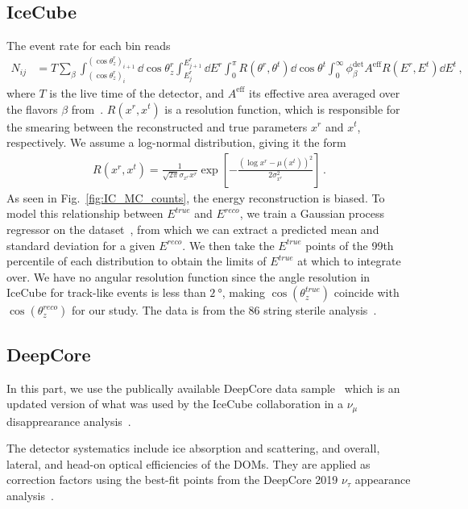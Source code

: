 \documentclass[draft=True]{revtex4-2}
\newcommand{\zreco}{\ensuremath{\cos{(\theta_z^{reco})}}}
\newcommand{\ztrue}{\ensuremath{\cos{(\theta_z^{true})}}}
\newcommand{\Ereco}{E^{reco}}
\newcommand{\Etrue}{E^{true}}
\begin{document}
\subsection{IceCube}\label{ch:ICmethod}
The event rate for each bin reads
\begin{align}\label{eq:ICevents}
   N_{ij} &= T\sum_\beta \int_{(\cos{\theta_z^r})_i}^{(\cos{\theta_z^r})_{i+1}} \dd \cos{\theta^r_z} \int_{E^r_{j}}^{E^r_{j+1}} \dd E^r \int_0^\pi R(\theta^r,\theta^t) \dd \cos{\theta^t} \int_0^\infty \phi_\beta^\text{det}  A^\text{eff} R(E^r,E^t) 
   \dd E^t\,,
\end{align}
where $T$ is the live time of the detector, and $A^\text{eff}$ its effective area averaged over the flavors $\beta$ from~\cite{ICaeff}. $R(x^r,x^t)$ is a resolution function, 
which is responsible for the smearing between the reconstructed and true parameters $x^r$ and $x^t$, respectively. We assume a log-normal distribution, giving it the form 
\begin{align}
    R(x^r, x^t) = \frac{1}{\sqrt{2\pi} \sigma_{x^r}x^r} \exp\left[-\frac{(\log x^r-\mu(x^t))^2}{2\sigma_{x^r}^2}\right]\,.
\end{align}
As seen in Fig.~\ref{fig:IC_MC_counts}, the energy reconstruction is biased. To model this relationship between $\Etrue$ and $\Ereco$, we train a Gaussian process regressor on the dataset~\cite{IC2016}, from which
we can extract a predicted mean and standard deviation for a given $E^{reco}$. We then take the $\Etrue$ points of the 99th percentile of each distribution to obtain
the limits of $\Etrue$ at which to integrate over. We have no angular resolution function since the angle resolution in IceCube for track-like events is less than $\SI{2}{\degree}$, making $\ztrue$ coincide with $\zreco$ for our study. 
The data is from the 86 string sterile analysis~\cite{IC2020}.

\subsection{DeepCore}\label{ch:DCmethod}
In this part, we use the publically available DeepCore data sample~\cite{DC2019data} which is an updated version of what was used by the 
IceCube collaboration in a $\nu_\mu$ disapprearance analysis~\cite{DC2018mudisappearance}.

The detector systematics include ice absorption and scattering, and overall, lateral, and head-on optical efficiencies of the DOMs. 
They are applied as correction factors using the best-fit points from the DeepCore 2019 $\nu_\tau$ appearance 
analysis~\cite{DC2019tauappearance}.
\end{document}
